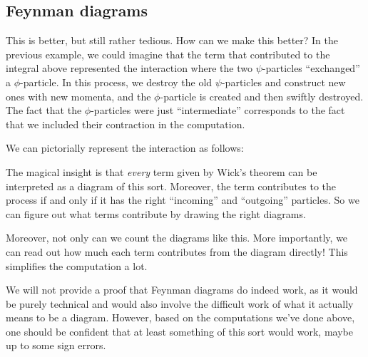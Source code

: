 \documentclass[a4paper]{article}
\begin{document}
\subsection{Feynman diagrams}
This is better, but still rather tedious. How can we make this better? In the previous example, we could imagine that the term that contributed to the integral above represented the interaction where the two $\psi$-particles ``exchanged'' a $\phi$-particle. In this process, we destroy the old $\psi$-particles and construct new ones with new momenta, and the $\phi$-particle is created and then swiftly destroyed. The fact that the $\phi$-particles were just ``intermediate'' corresponds to the fact that we included their contraction in the computation.

We can pictorially represent the interaction as follows:
\begin{center}
\end{center}
The magical insight is that \emph{every} term given by Wick's theorem can be interpreted as a diagram of this sort. Moreover, the term contributes to the process if and only if it has the right ``incoming'' and ``outgoing'' particles. So we can figure out what terms contribute by drawing the right diagrams.

Moreover, not only can we count the diagrams like this. More importantly, we can read out how much each term contributes from the diagram directly! This simplifies the computation a lot.

We will not provide a proof that Feynman diagrams do indeed work, as it would be purely technical and would also involve the difficult work of what it actually means to be a diagram. However, based on the computations we've done above, one should be confident that at least something of this sort would work, maybe up to some sign errors.
\end{document}
